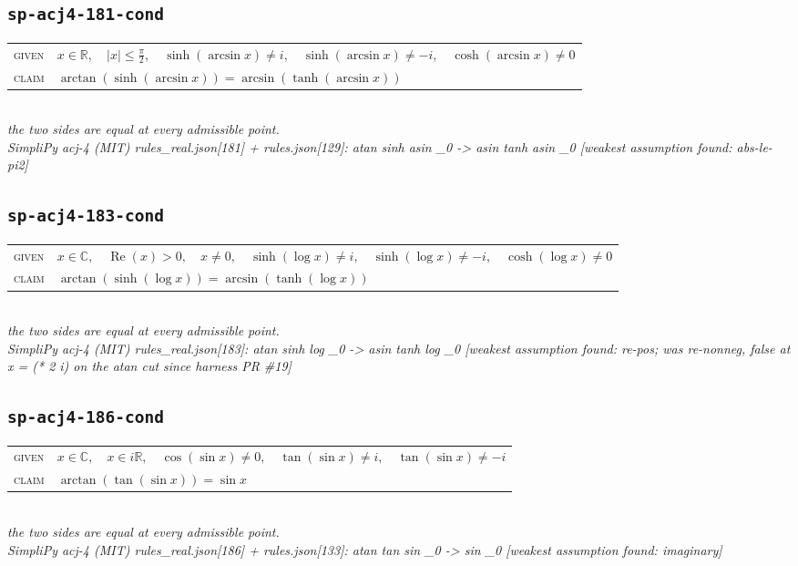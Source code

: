 \documentclass[11pt]{article}
\begin{document}
\subsection*{\texttt{sp-acj4-181-cond}}
\begin{tabular}{@{}l@{\quad}l@{}}
\textsc{given} & $x \in \mathbb{R},\quad \left|x\right| \le \frac{\pi}{2},\quad \sinh\left(\arcsin x\right) \neq i,\quad \sinh\left(\arcsin x\right) \neq -i,\quad \cosh\left(\arcsin x\right) \neq 0$ \\[4pt]
\textsc{claim} & $\displaystyle \arctan\left(\sinh\left(\arcsin x\right)\right) = \arcsin\left(\tanh\left(\arcsin x\right)\right)$ \\
\end{tabular}\\[2pt]
{\small\emph{the two sides are equal at every admissible point.}}\\
\emph{SimpliPy acj-4 (MIT) rules\_real.json[181] + rules.json[129]: atan sinh asin \_0  ->  asin tanh asin \_0  [weakest assumption found: abs-le-pi2]}\\

\subsection*{\texttt{sp-acj4-183-cond}}
\begin{tabular}{@{}l@{\quad}l@{}}
\textsc{given} & $x \in \mathbb{C},\quad \operatorname{Re}\left(x\right) > 0,\quad x \neq 0,\quad \sinh\left(\log x\right) \neq i,\quad \sinh\left(\log x\right) \neq -i,\quad \cosh\left(\log x\right) \neq 0$ \\[4pt]
\textsc{claim} & $\displaystyle \arctan\left(\sinh\left(\log x\right)\right) = \arcsin\left(\tanh\left(\log x\right)\right)$ \\
\end{tabular}\\[2pt]
{\small\emph{the two sides are equal at every admissible point.}}\\
\emph{SimpliPy acj-4 (MIT) rules\_real.json[183]: atan sinh log \_0  ->  asin tanh log \_0  [weakest assumption found: re-pos; was re-nonneg, false at x = (* 2 i) on the atan cut since harness PR \#19]}\\

\subsection*{\texttt{sp-acj4-186-cond}}
\begin{tabular}{@{}l@{\quad}l@{}}
\textsc{given} & $x \in \mathbb{C},\quad x \in i\mathbb{R},\quad \cos\left(\sin x\right) \neq 0,\quad \tan\left(\sin x\right) \neq i,\quad \tan\left(\sin x\right) \neq -i$ \\[4pt]
\textsc{claim} & $\displaystyle \arctan\left(\tan\left(\sin x\right)\right) = \sin x$ \\
\end{tabular}\\[2pt]
{\small\emph{the two sides are equal at every admissible point.}}\\
\emph{SimpliPy acj-4 (MIT) rules\_real.json[186] + rules.json[133]: atan tan sin \_0  ->  sin \_0  [weakest assumption found: imaginary]}\\
\end{document}
